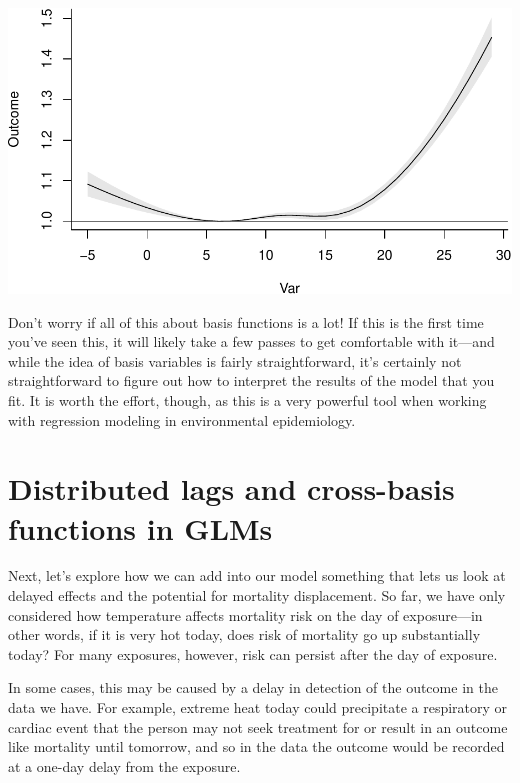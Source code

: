 \documentclass[
]{book}
\begin{document}
\includegraphics{adv_epi_analysis_files/figure-latex/unnamed-chunk-83-1.pdf}

Don't worry if all of this about basis functions is a lot! If this is the first time you've
seen this, it will likely take a few passes to get comfortable with it---and while the idea
of basis variables is fairly straightforward, it's certainly not straightforward to figure
out how to interpret the results of the model that you fit. It is worth the effort, though,
as this is a very powerful tool when working with regression modeling in environmental
epidemiology.

\hypertarget{distributed-lags-and-cross-basis-functions-in-glms}{%
\section{Distributed lags and cross-basis functions in GLMs}\label{distributed-lags-and-cross-basis-functions-in-glms}}

Next, let's explore how we can add into our model something that lets us look at
delayed effects and the potential for mortality displacement. So far, we have only
considered how temperature affects mortality risk on the day of exposure---in other
words, if it is very hot today, does risk of mortality go up substantially today?
For many exposures, however, risk can persist after the day of exposure.

In some cases, this may be caused by a delay in detection of the outcome in the
data we have. For example, extreme heat today could precipitate a respiratory or
cardiac event that the person may not seek treatment for or result in an outcome
like mortality until tomorrow, and so in the data the outcome would be recorded
at a one-day delay from the exposure.
\end{document}
